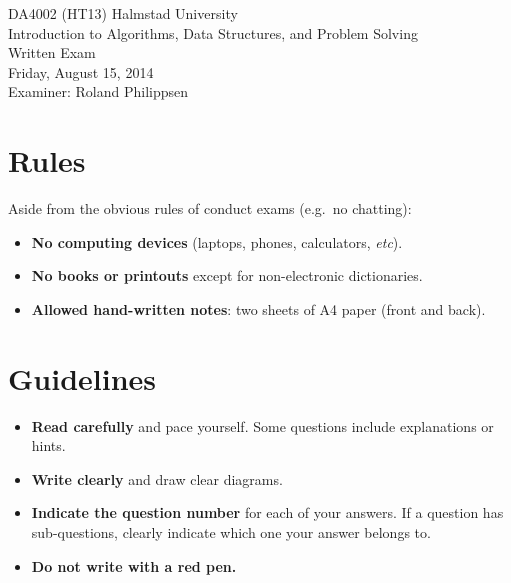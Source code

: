 \documentclass[a4paper]{article}
\newcounter{question}
\begin{document}
\pagestyle{empty}
\thispagestyle{empty}



\noindent
\begin{minipage}{\columnwidth}
  \centering
  \Large
  DA4002 (HT13) Halmstad University\\
  Introduction to Algorithms, Data Structures, and Problem Solving\\[3\baselineskip]
  \Huge
  Written Exam\\
  \Large
  Friday, August 15, 2014\\[2\baselineskip]
  Examiner: Roland Philippsen
\end{minipage}

\vfill

\noindent
\begin{center}
\end{center}

\vfill



\section*{Rules}

Aside from the obvious rules of conduct exams (e.g.\ no chatting):

\begin{itemize}
\item
  \textbf{No computing devices} (laptops, phones, calculators, \emph{etc}).
\item
  \textbf{No books or printouts} except for non-electronic dictionaries.
\item
  \textbf{Allowed hand-written notes}: two sheets of A4 paper (front and back).
\end{itemize}



\section*{Guidelines}

\begin{itemize}
\item
  \textbf{Read carefully} and pace yourself.
  Some questions include explanations or hints.
\item
  \textbf{Write clearly} and draw clear diagrams.
\item
  \textbf{Indicate the question number} for each of your answers.
  If a question has sub-questions, clearly indicate which one your answer belongs to.
\item
  \textbf{Do not write with a red pen.}
\end{itemize}
\end{document}
